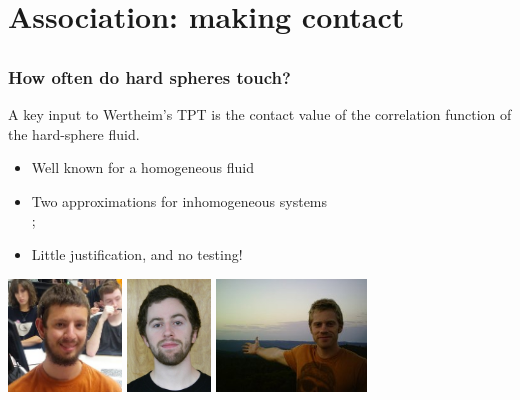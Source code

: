 \section{Association:  making contact}
\subsection*{}

\begin{frame}
  \frametitle{How often do hard spheres touch?}

  \begin{block}{}
  A key input to Wertheim's TPT is the contact value of the
  correlation function of the hard-sphere fluid.
  \begin{itemize}
  \item Well known for a homogeneous fluid
  \item Two approximations for inhomogeneous systems
    \\ \hfill {\tiny ;
    }
  \item Little justification, and no testing!
  \end{itemize}
  \end{block}
  \begin{center}
    \includegraphics[height=3cm]{figs/HaglundChris}
    \includegraphics[height=3cm]{figs/KreitzbergPatrick}
    \includegraphics[height=3cm]{figs/SchulteJeff}
  \end{center}
\end{frame}

